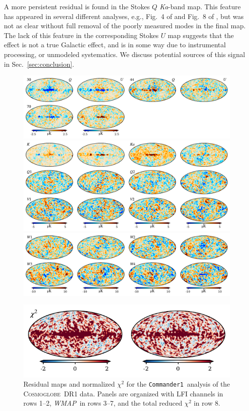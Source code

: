 \documentclass[twocolumn]{../../common/aa}
\def\WMAP{\emph{WMAP}}
\def\commanderone{\texttt{Commander1}}
\newcommand{\cosmoglobe}{\textsc{Cosmoglobe}}
\newcommand{\Ka}[0]{\textit{Ka}}
\begin{document}
A more persistent residual is found in the Stokes $Q$ \Ka-band map. This feature has appeared in several different analyses, e.g., Fig.~4 of \citet{bp14} and Fig.~8 of \citet{weiland:2022}, but was not as clear without full removal of the poorly measured modes in the final map. The lack of this feature in the corresponding Stokes $U$ map suggests that the effect is not a true Galactic effect, and is in some way due to instrumental processing, or unmodeled systematics. We discuss potential sources of this signal in Sec.~\ref{sec:conclusion}.

\begin{figure}
	\begin{center}
	\includegraphics[width=\linewidth]{figures/comm1_res_QU_LFI.pdf}\vspace{-0.3cm}
	\includegraphics[width=\linewidth]{figures/comm1_res_QU_K-V.pdf}\vspace{-0.3cm}
	\includegraphics[width=\linewidth]{figures/comm1_res_QU_W.pdf}\vspace{-0.3cm}
	\end{center}\vspace{-0.3cm}
	\includegraphics[width=0.5\linewidth]{figures/comm1_res_QU_chisq.pdf}
	\caption{Residual maps and normalized $\chi^2$ for the \commanderone\ analysis of the \cosmoglobe\ DR1 data. Panels are organized with LFI channels in rows 1--2, \WMAP\ in rows 3--7, and the total reduced $\chi^2$ in row 8.}
	\label{fig:res_QU}
\end{figure}
\end{document}
